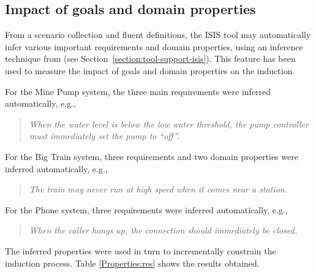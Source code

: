 
\subsection{Impact of goals and domain properties}

From a scenario collection and fluent definitions, the ISIS tool may automatically infer various important requirements and domain properties, using an inference technique from \cite{Damas:2006, Damas:2011} (see Section~\ref{section:tool-support-isis}). This feature has been used to measure the impact of goals and domain properties on the induction.

For the Mine Pump system, the three main requirements were inferred automatically, e.g.,
\begin{quote}
\emph{When the water level is below the low water threshold, the pump controller must immediately set the pump to “off”.}
\end{quote}

For the Big Train system, three requirements and two domain properties were inferred automatically, e.g.,
\begin{quote}
\emph{The train may never run at high speed when it comes near a station.}
\end{quote}

For the Phone system, three requirements were inferred automatically, e.g.,

\begin{quote}
\emph{When the caller hangs up, the connection should immediately be closed.}
\end{quote}

The inferred properties were used in turn to incrementally constrain the induction process. Table \ref{Properties:res} shows the results obtained.

